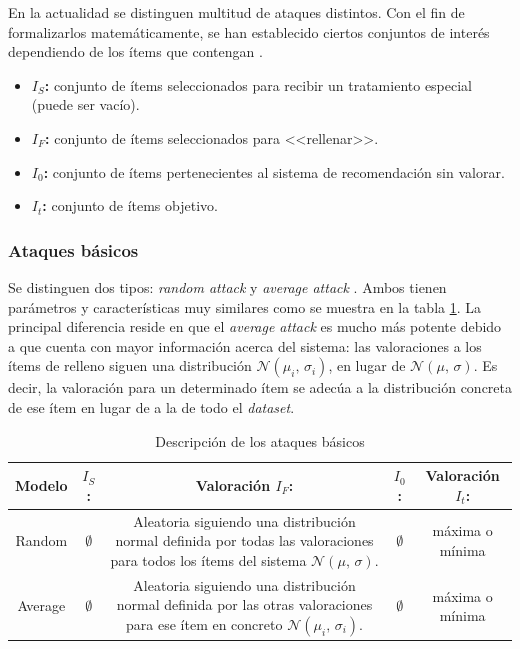 En la actualidad se distinguen multitud de ataques distintos. Con el fin de formalizarlos matemáticamente, se han establecido ciertos conjuntos de interés dependiendo de los ítems que contengan \cite{zhou2021SemisupervisedRecommendationAttack}.

\begin{itemize}
	
	\item \textbf{$I_S$:} conjunto de ítems seleccionados para recibir un tratamiento especial (puede ser vacío).
	\item \textbf{$I_F$:} conjunto de ítems seleccionados para <<rellenar>>.
	\item \textbf{$I_0$:} conjunto de ítems pertenecientes al sistema de recomendación sin valorar.
	\item \textbf{$I_t$:} conjunto de ítems objetivo.
	
\end{itemize}


\subsubsection{Ataques básicos}

Se distinguen dos tipos: \textit{random attack} y \textit{average attack} \cite{mingdan2018ShillingAttacksAReview}. Ambos tienen parámetros y características muy similares como se muestra en la tabla \ref{tabla_descripcion_ataques_basicos}. La principal diferencia reside en que el \textit{average attack} es mucho más potente debido a que cuenta con mayor información acerca del sistema: las valoraciones a los ítems de relleno siguen una distribución $\mathcal{N}(\mu_i,\,\sigma_i)$, en lugar de $\mathcal{N}(\mu,\,\sigma)$. Es decir, la valoración para un determinado ítem se adecúa a la distribución concreta de ese ítem en lugar de a la de todo el \textit{dataset}.

\begin{table}
	\centering
	\resizebox{15cm}{!} {
		\begin{tabular}{|c c c c c|}
		\hline
		
		Modelo & \textbf{$I_S$:} & Valoración \textbf{$I_F$:} & \textbf{$I_0$:} & Valoración \textbf{$I_t$:} \\\hline \hline
	
		Random & $\emptyset$ & \parbox{20em}{Aleatoria siguiendo una distribución normal definida por todas las valoraciones para todos los ítems del sistema $\mathcal{N}(\mu,\,\sigma)$.} & $\emptyset$ & máxima o mínima \\\hline
		
		Average & $\emptyset$ & \parbox{20em}{Aleatoria siguiendo una distribución normal definida por las otras valoraciones para ese ítem en concreto $\mathcal{N}(\mu_i,\,\sigma_i)$.} & $\emptyset$ & máxima o mínima \\\hline
		\end{tabular}
	}
	\caption{Descripción de los ataques básicos \cite{zhou2021SemisupervisedRecommendationAttack}}
	\label{tabla_descripcion_ataques_basicos}	
\end{table}


